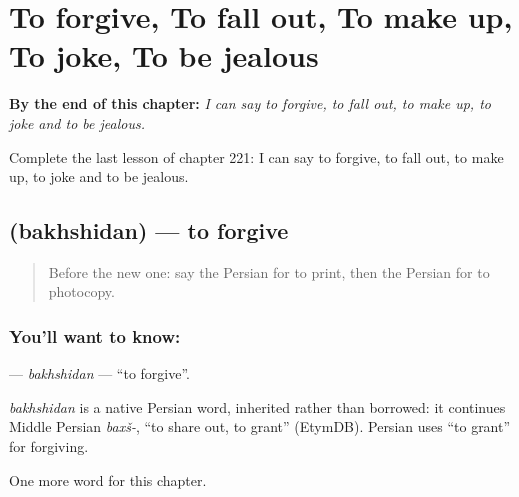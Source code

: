 
\chapter{To forgive, To fall out, To make up, To joke, To be jealous}
\label{ch:fa-to-forgive-to-fall-out-to-make-up-to-joke-to-be-jealous}

\begin{chapteropening}
\textbf{By the end of this chapter:} \emph{I can say to forgive, to fall out, to make up, to joke and to be jealous.}

Complete the last lesson of chapter 221: I can say to forgive, to fall out, to make up, to joke and to be jealous.
\end{chapteropening}

\section[\texorpdfstring{\fa{بخشیدن} (bakhshidan)}{بخشیدن (bakhshidan)}]{ (bakhshidan) — to forgive}

\label{lesson:FA-C221-bakhshidan}



\begin{quote}
Before the new one: say the Persian for to print, then the Persian for to photocopy.
\end{quote}

\subsection*{You'll want to know: }
\textbf{} — \emph{bakhshidan} — \textquotedblleft{}to forgive\textquotedblright{}.

\begin{cousinweb}
\emph{bakhshidan} is a native Persian word, inherited rather than borrowed: it continues Middle Persian \emph{baxš-}, \textquotedblleft{}to share out, to grant\textquotedblright{} (EtymDB). Persian uses \textquotedblleft{}to grant\textquotedblright{} for forgiving.
\end{cousinweb}

\begin{grammarlens}[title={What you've built}]
One more word for this chapter.
\end{grammarlens}

